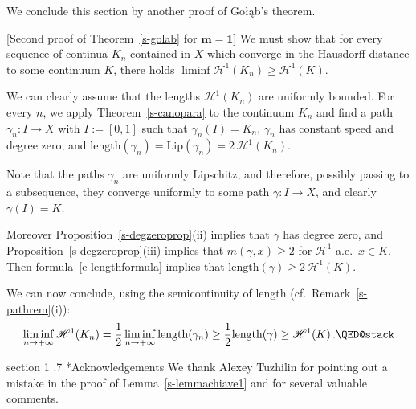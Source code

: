 \documentclass[11pt,reqno,a4paper,final]{amsart}
\makeatletter
\numberwithin{equation}{section}
\theoremstyle{mytheorem}
\theoremstyle{myremark}
\theoremstyle{myparagraph}
\def\section{\@startsection%
{section}%
{1}%
\z@{1.5\linespacing\@plus .2\linespacing}%
  {.7\linespacing}%
  {\normalfont\sc\centering}}%
\renewenvironment{proof}[1][\proofname]{\par 
  \pushQED{\qed}%
  \normalfont \topsep10\p@\@plus6\p@\relax 
  \trivlist 
  \item[\hskip\labelsep 
    \bfseries 
    #1\@addpunct{.}]\ignorespaces 
}{%
  \popQED\endtrivlist\@endpefalse 
}
\providecommand{\proofname}{Proof}
\newcommand{\Haus}{\mathscr{H}}
\newcommand{\Golab}{Go{\l}\k{a}b}
\newcommand{\Len}{\mathrm{length}}
\newcommand{\Lip}{\mathrm{Lip}}
\makeatother
\begin{document}
We conclude this section by another proof of \Golab's theorem. 


\begin{proof}
[Second proof of Theorem~\ref{s-golab} for $\boldsymbol{m=1}$]
We must show that for every sequence of continua $K_n$ 
contained in $X$ which converge in the Hausdorff distance
to some continuum $K$, there holds 
$\liminf \Haus^1(K_n) \ge \Haus^1(K)$.

We can clearly assume that the lengths $\Haus^1(K_n)$
are uniformly bounded.
For every $n$, we apply Theorem~\ref{s-canopara}
to the continuum $K_n$ and find a path $\gamma_n:I\to X$
with $I:=[0,1]$ such that 
$\gamma_n(I)=K_n$, 
$\gamma_n$ has constant speed and degree zero, 
and $\Len(\gamma_n)=\Lip(\gamma_n)=2\,\Haus^1(K_n)$.

Note that the paths $\gamma_n$ are uniformly Lipschitz, 
and therefore, possibly passing to a subsequence, 
they converge uniformly to some path $\gamma: I\to X$, 
and clearly $\gamma(I)=K$. 

Moreover Proposition~\ref{s-degzeroprop}(ii) implies 
that $\gamma$ has degree zero, and Proposition~\ref{s-degzeroprop}(iii) 
implies that $m(\gamma,x)\ge 2$ for $\Haus^1$-a.e.~$x\in K$. 
Then formula~\eqref{e-lengthformula} implies
that $\Len(\gamma) \ge 2\,\Haus^1(K)$.

We can now conclude, using the semicontinuity of length
(cf.~Remark~\ref{s-pathrem}(i)):
\[
\liminf_{n\to+\infty} \Haus^1(K_n)
=\frac{1}{2} \liminf_{n\to+\infty} \Len(\gamma_n)
\ge \frac{1}{2} \Len(\gamma)
\ge \Haus^1(K)
\, .
\qedhere
\]
\end{proof}


\section*{Acknowledgements}
We thank Alexey Tuzhilin for pointing 
out a mistake in the proof of Lemma~\ref{s-lemmachiave1} 
and for several valuable comments.
\end{document}
